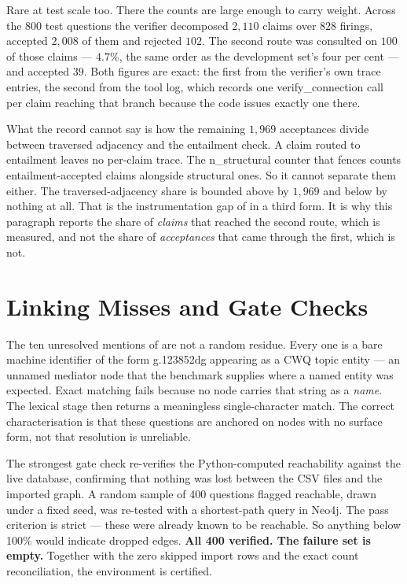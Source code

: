 Rare at test scale too. There the counts are large enough to carry weight.
Across the $800$ test questions the verifier decomposed $2{,}110$ claims over
$828$ firings, accepted $2{,}008$ of them and rejected $102$. The second route
was consulted on $100$ of those claims --- $4.7\%$, the same order as the
development set's four per cent --- and accepted $39$. Both figures are exact:
the first from the verifier's own trace entries, the second from the tool log,
which records one \textsf{verify\_connection} call per claim reaching that
branch because the code issues exactly one there.

What the record cannot say is how the remaining $1{,}969$ acceptances divide
between traversed adjacency and the entailment check. A claim routed to
entailment leaves no per-claim trace. The \textsf{n\_structural} counter that
 fences counts entailment-accepted claims alongside
structural ones. So it cannot separate them either. The traversed-adjacency
share is bounded above by $1{,}969$ and below by nothing at all. That is the
instrumentation gap of  in a third form. It is why this
paragraph reports the share of \emph{claims} that reached the second route,
which is measured, and not the share of \emph{acceptances} that came through
the first, which is not.


\section{Linking Misses and Gate Checks}\label{app:linking-misses}

The ten unresolved mentions of  are not a random residue.
Every one is a bare machine identifier of the form \textsf{g.123852dg} appearing
as a CWQ topic entity --- an unnamed mediator node that the benchmark supplies
where a named entity was expected. Exact matching fails because no node carries
that string as a \emph{name}. The lexical stage then returns a meaningless
single-character match. The correct characterisation is that these questions are
anchored on nodes with no surface form, not that resolution is unreliable.

The strongest gate check re-verifies the Python-computed reachability against
the live database, confirming that nothing was lost between the CSV files and
the imported graph. A random sample of 400 questions flagged reachable, drawn
under a fixed seed, was re-tested with a shortest-path query in Neo4j. The pass
criterion
is strict --- these were already known to be reachable. So anything below 100\%
would indicate dropped edges. \textbf{All 400 verified. The failure set is
empty.} Together with the zero skipped import rows and the exact count
reconciliation, the environment is certified.


